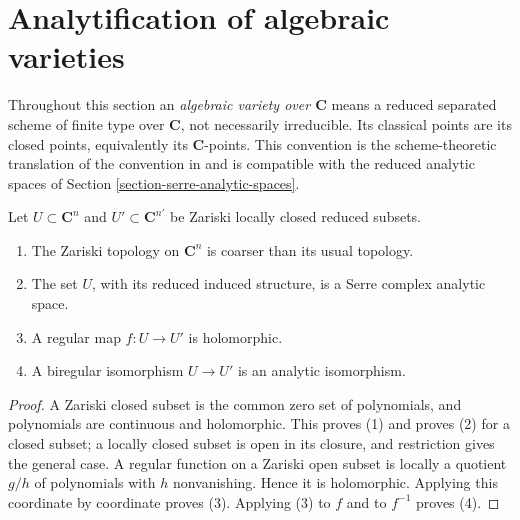 %

\section{Analytification of algebraic varieties}
\label{section-analytification}

\noindent
Throughout this section an {\it algebraic variety over $\mathbf C$} means a
reduced separated scheme of finite type over $\mathbf C$, not necessarily
irreducible. Its classical points are its closed points, equivalently its
$\mathbf C$-points. This convention is the scheme-theoretic translation of
the convention in \cite[\S 2, no. 5]{GAGA} and is compatible with the reduced
analytic spaces of Section \ref{section-serre-analytic-spaces}.

\begin{lemma}
\label{lemma-algebraic-charts-analytic}
Let $U \subset \mathbf C^n$ and $U' \subset \mathbf C^{n'}$ be Zariski locally
closed reduced subsets.
\begin{enumerate}
\item The Zariski topology on $\mathbf C^n$ is coarser than its usual topology.
\item The set $U$, with its reduced induced structure, is a Serre complex
analytic space.
\item A regular map $f : U \to U'$ is holomorphic.
\item A biregular isomorphism $U \to U'$ is an analytic isomorphism.
\end{enumerate}
\end{lemma}

\begin{proof}
A Zariski closed subset is the common zero set of polynomials, and polynomials
are continuous and holomorphic. This proves (1) and proves (2) for a closed
subset; a locally closed subset is open in its closure, and restriction gives
the general case. A regular function on a Zariski open subset is locally a
quotient $g/h$ of polynomials with $h$ nonvanishing. Hence it is holomorphic.
Applying this coordinate by coordinate proves (3). Applying (3) to $f$ and to
$f^{-1}$ proves (4).
\end{proof}


